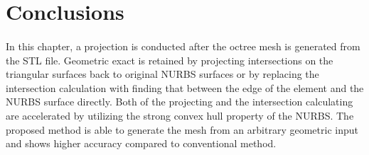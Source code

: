 \section{Conclusions}
\paragraph{}
In this chapter, a projection is conducted after the octree mesh is generated from the STL file.
Geometric exact is retained by projecting intersections on the triangular surfaces back to original NURBS surfaces or by replacing the intersection calculation with finding that between the edge of the element and the NURBS surface directly. 
Both of the projecting and the intersection calculating are accelerated by utilizing the strong convex hull property of the NURBS.
The proposed method is able to generate the mesh from an arbitrary geometric input and shows higher accuracy compared to conventional method.